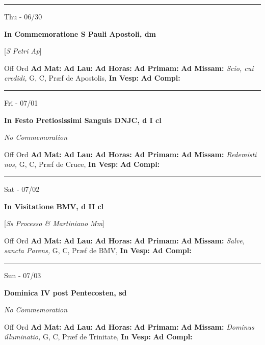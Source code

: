 \documentclass[letterpaper, 10pt]{article}
\begin{document}
\hrule
\begin{center}
Thu - 06/30
\end{center}\textbf{ \large In Commemoratione S Pauli Apostoli, \textnormal{\normalsize dm}}

[\textit{S Petri Ap}]
\begin{justify}
Off Ord
\textbf{Ad Mat: }
\textbf{Ad Lau: }
\textbf{Ad Horas: }
\textbf{Ad Primam: }
\textbf{Ad Missam:} \textit{Scio, cui credidi, } G, C, Præf de Apostolis, 
\textbf{In Vesp: }
\textbf{Ad Compl: }\end{justify}



\hrule
\begin{center}
Fri - 07/01
\end{center}\textbf{ \large In Festo Pretiosissimi Sanguis DNJC, \textnormal{\normalsize d I cl}}

\textit{No Commemoration}\begin{justify}
Off Ord
\textbf{Ad Mat: }
\textbf{Ad Lau: }
\textbf{Ad Horas: }
\textbf{Ad Primam: }
\textbf{Ad Missam:} \textit{Redemisti nos, } G, C, Præf de Cruce, 
\textbf{In Vesp: }
\textbf{Ad Compl: }\end{justify}



\hrule
\begin{center}
Sat - 07/02
\end{center}\textbf{ \large In Visitatione BMV, \textnormal{\normalsize d II cl}}

[\textit{Ss Processo \& Martiniano Mm}]
\begin{justify}
Off Ord
\textbf{Ad Mat: }
\textbf{Ad Lau: }
\textbf{Ad Horas: }
\textbf{Ad Primam: }
\textbf{Ad Missam:} \textit{Salve, sancta Parens, } G, C, Præf de BMV, 
\textbf{In Vesp: }
\textbf{Ad Compl: }\end{justify}



\hrule
\begin{center}
Sun - 07/03
\end{center}\textbf{ \large Dominica IV post Pentecosten, \textnormal{\normalsize sd}}

\textit{No Commemoration}\begin{justify}
Off Ord
\textbf{Ad Mat: }
\textbf{Ad Lau: }
\textbf{Ad Horas: }
\textbf{Ad Primam: }
\textbf{Ad Missam:} \textit{Dominus illuminatio, } G, C, Præf de Trinitate, 
\textbf{In Vesp: }
\textbf{Ad Compl: }\end{justify}
\end{document}
